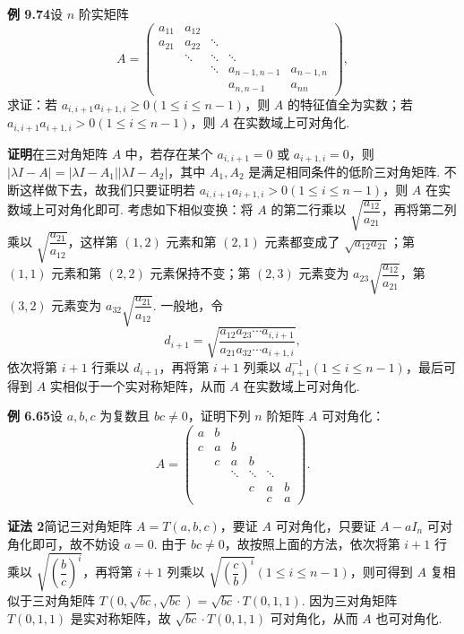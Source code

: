 \documentclass[UTF8,12pt,a4paper,fontset=fandol]{ctexart}
\begin{document}
\noindent\textbf{例 9.74}\quad 设 $n$ 阶实矩阵
\[
A=\begin{pmatrix}
a_{11}&a_{12}&&&\\
a_{21}&a_{22}&\ddots&&\\
&\ddots&\ddots&\ddots&\\
&&\ddots&a_{n-1,n-1}&a_{n-1,n}\\
&&&a_{n,n-1}&a_{nn}
\end{pmatrix},
\]
求证：若 $a_{i,i+1}a_{i+1,i}\ge0(1\le i\le n-1)$，则 $A$ 的特征值全为实数；若 $a_{i,i+1}a_{i+1,i}>0(1\le i\le n-1)$，则 $A$ 在实数域上可对角化.

\noindent\textbf{证明}\quad 在三对角矩阵 $A$ 中，若存在某个 $a_{i,i+1}=0$ 或 $a_{i+1,i}=0$，则 $|\lambda I-A|=|\lambda I-A_1||\lambda I-A_2|$，其中 $A_1,A_2$ 是满足相同条件的低阶三对角矩阵. 不断这样做下去，故我们只要证明若 $a_{i,i+1}a_{i+1,i}>0(1\le i\le n-1)$，则 $A$ 在实数域上可对角化即可. 考虑如下相似变换：将 $A$ 的第二行乘以 $\sqrt{\dfrac{a_{12}}{a_{21}}}$，再将第二列乘以 $\sqrt{\dfrac{a_{21}}{a_{12}}}$，这样第 $(1,2)$ 元素和第 $(2,1)$ 元素都变成了 $\sqrt{a_{12}a_{21}}$；第 $(1,1)$ 元素和第 $(2,2)$ 元素保持不变；第 $(2,3)$ 元素变为 $a_{23}\sqrt{\dfrac{a_{12}}{a_{21}}}$，第 $(3,2)$ 元素变为 $a_{32}\sqrt{\dfrac{a_{21}}{a_{12}}}$. 一般地，令
\[
d_{i+1}=\sqrt{\frac{a_{12}a_{23}\cdots a_{i,i+1}}{a_{21}a_{32}\cdots a_{i+1,i}}},
\]
依次将第 $i+1$ 行乘以 $d_{i+1}$，再将第 $i+1$ 列乘以 $d_{i+1}^{-1}(1\le i\le n-1)$，最后可得到 $A$ 实相似于一个实对称矩阵，从而 $A$ 在实数域上可对角化.

\noindent\textbf{例 6.65}\quad 设 $a,b,c$ 为复数且 $bc\ne0$，证明下列 $n$ 阶矩阵 $A$ 可对角化：
\[
A=\begin{pmatrix}
a&b&&&\\
c&a&b&&\\
&c&a&b&\\
&&\ddots&\ddots&\ddots\\
&&&c&a&b\\
&&&&c&a
\end{pmatrix}.
\]

\noindent\textbf{证法 2}\quad 简记三对角矩阵 $A=T(a,b,c)$，要证 $A$ 可对角化，只要证 $A-aI_n$ 可对角化即可，故不妨设 $a=0$. 由于 $bc\ne0$，故按照上面的方法，依次将第 $i+1$ 行乘以 $\sqrt{\left(\dfrac bc\right)^i}$，再将第 $i+1$ 列乘以 $\sqrt{\left(\dfrac cb\right)^i}(1\le i\le n-1)$，则可得到 $A$ 复相似于三对角矩阵 $T(0,\sqrt{bc},\sqrt{bc})=\sqrt{bc}\cdot T(0,1,1)$. 因为三对角矩阵 $T(0,1,1)$ 是实对称矩阵，故 $\sqrt{bc}\cdot T(0,1,1)$ 可对角化，从而 $A$ 也可对角化.
\end{document}
